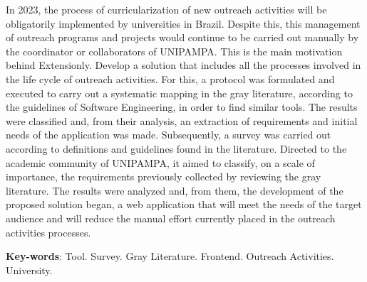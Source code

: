 \begin{resumo}[Abstract]
In 2023, the process of curricularization of new outreach activities will be obligatorily implemented by universities in Brazil. Despite this, this management of outreach programs and projects would continue to be carried out manually by the coordinator or collaborators of \acs{UNIPAMPA}. This is the main motivation behind Extensionly. Develop a solution that includes all the processes involved in the life cycle of outreach activities. For this, a protocol was formulated and executed to carry out a systematic mapping in the gray literature, according to the guidelines of Software Engineering, in order to find similar tools. The results were classified and, from their analysis, an extraction of requirements and initial needs of the application was made. Subsequently, a survey was carried out according to definitions and guidelines found in the literature. Directed to the academic community of \ac{UNIPAMPA}, it aimed to classify, on a scale of importance, the requirements previously collected by reviewing the gray literature. The results were analyzed and, from them, the development of the proposed solution began, a web application that will meet the needs of the target audience and will reduce the manual effort currently placed in the outreach activities processes.

 \vspace{\onelineskip}
 
 \noindent 
 \textbf{Key-words}: Tool. Survey. Gray Literature. Frontend. Outreach Activities. University.
\end{resumo}
